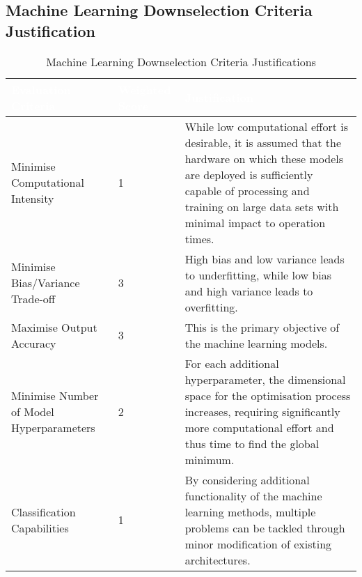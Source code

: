 \subsection{Machine Learning Downselection Criteria Justification} %

\label{appendix:Machine_Learning_DS_Justifiaction} %


\begin{table}[h!]
    \caption{Machine Learning Downselection Criteria Justifications}
    \label{tab:ML:downselection_justifications}
    \centering
    \begin{tabular}{|>{\raggedright}m{}|>{\raggedright}m{}|>{\arraybackslash}m{}|}
        \cellcolor{gray!120}\textcolor{white}{\textbf{Evaluation Criteria}} & \cellcolor{gray!120}\textcolor{white}{\textbf{Weighted Score}} & \cellcolor{gray!120}\textcolor{white}{\textbf{Justification}} \\
        \hline
        \hline
        Minimise Computational Intensity & 1 & While low computational effort is desirable, it is assumed that the hardware on which these models are deployed is sufficiently capable of processing and training on large data sets with minimal impact to operation times.\\
        Minimise Bias/Variance Trade-off & 3 & High bias and low variance leads to underfitting, while low bias and high variance leads to overfitting.\\
        Maximise Output Accuracy & 3 & This is the primary objective of the machine learning models.\\
        Minimise Number of Model Hyperparameters & 2 & For each additional hyperparameter, the dimensional space for the optimisation process increases, requiring significantly more computational effort and thus time to find the global minimum.\\
        Classification Capabilities & 1 & By considering additional functionality of the machine learning methods, multiple problems can be tackled through minor modification of existing architectures. \\
        \hline
    \end{tabular}

\end{table}